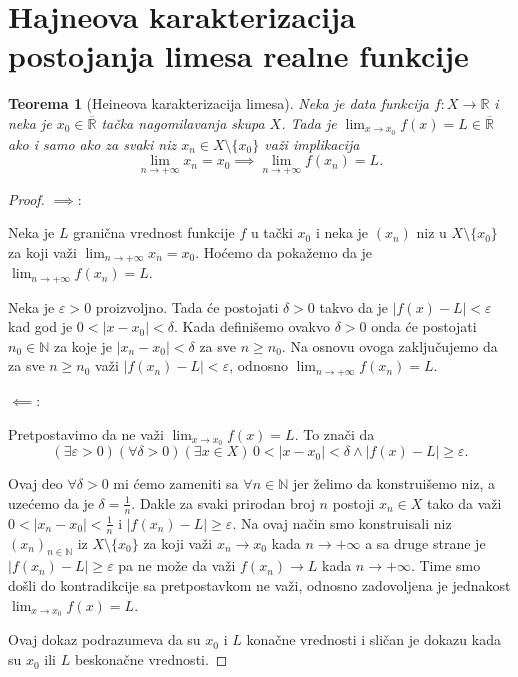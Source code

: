 \documentclass[a4paper,12pt]{article}
\theoremstyle{plain}
\newtheorem{theorem}{Teorema}[section]
\theoremstyle{definition}
\theoremstyle{remark}
\begin{document}
\section{Hajneova karakterizacija postojanja limesa realne funkcije}

\begin{theorem}[Heineova karakterizacija limesa]
Neka je data funkcija $f : X \to \mathbb{R}$ i neka je $x_0 \in \overline{\mathbb{R}}$ tačka nagomilavanja skupa $X$. Tada je $\lim_{x \to x_0} f(x) = L \in \overline{\mathbb{R}}$ ako i samo ako za svaki niz $x_n \in X \setminus \{x_0\}$ važi implikacija
$$ \lim_{n \to +\infty} x_n = x_0 \implies \lim_{n \to +\infty} f(x_n) = L. $$
\end{theorem}

\begin{proof}
$\implies:$ 

Neka je $L$ granična vrednost funkcije $f$ u tački $x_0$ i neka je $(x_n)$ niz u $X \setminus \{x_0\}$ za koji važi $\lim_{n \to +\infty} x_n = x_0$. Hoćemo da pokažemo da je $\lim_{n \to +\infty} f(x_n) = L$.

Neka je $\varepsilon > 0$ proizvoljno. Tada će postojati $\delta > 0$ takvo da je $|f(x) - L| < \varepsilon$ kad god je $0 < |x - x_0| < \delta$. Kada definišemo ovakvo $\delta > 0$ onda će postojati $n_0 \in \mathbb{N}$ za koje je $|x_n - x_0| < \delta$ za sve $n \ge n_0$. Na osnovu ovoga zaključujemo da za sve $n \ge n_0$ važi $|f(x_n) - L| < \varepsilon$, odnosno $\lim_{n \to +\infty} f(x_n) = L$.

$\impliedby:$

Pretpostavimo da ne važi $\lim_{x \to x_0} f(x) = L$. To znači da
$$ (\exists \varepsilon > 0)(\forall \delta > 0)(\exists x \in X) \, 0 < |x - x_0| < \delta \land |f(x) - L| \ge \varepsilon. $$

Ovaj deo $\forall \delta > 0$ mi ćemo zameniti sa $\forall n \in \mathbb{N}$ jer želimo da konstruišemo niz, a uzećemo da je $\delta = \frac{1}{n}$. Dakle za svaki prirodan broj $n$ postoji $x_n \in X$ tako da važi $0 < |x_n - x_0| < \frac{1}{n}$ i $|f(x_n) - L| \ge \varepsilon$. Na ovaj način smo konstruisali niz $(x_n)_{n \in \mathbb{N}}$ iz $X \setminus \{x_0\}$ za koji važi $x_n \to x_0$ kada $n \to +\infty$ a sa druge strane je $|f(x_n) - L| \ge \varepsilon$ pa ne može da važi $f(x_n) \to L$ kada $n \to +\infty$. Time smo došli do kontradikcije sa pretpostavkom ne važi, odnosno zadovoljena je jednakost $\lim_{x \to x_0} f(x) = L$.

Ovaj dokaz podrazumeva da su $x_0$ i $L$ konačne vrednosti i sličan je dokazu kada su $x_0$ ili $L$ beskonačne vrednosti.
\end{proof}
\end{document}
